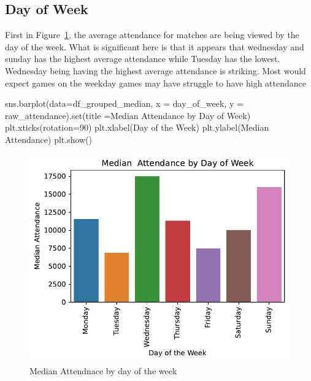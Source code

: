 \documentclass[
  letterpaper,
  DIV=11,
  numbers=noendperiod]{scrartcl}
\newenvironment{Shaded}{\begin{snugshade}}{\end{snugshade}}
\newcommand{\BuiltInTok}[1]{\textcolor[rgb]{0.00,0.23,0.31}{#1}}
\newcommand{\DecValTok}[1]{\textcolor[rgb]{0.68,0.00,0.00}{#1}}
\newcommand{\NormalTok}[1]{\textcolor[rgb]{0.00,0.23,0.31}{#1}}
\newcommand{\OperatorTok}[1]{\textcolor[rgb]{0.37,0.37,0.37}{#1}}
\newcommand{\StringTok}[1]{\textcolor[rgb]{0.13,0.47,0.30}{#1}}
\begin{document}
\hypertarget{day-of-week}{%
\subsection{Day of Week}\label{day-of-week}}

First in Figure~\ref{fig-day_median_attend}, the average attendance for
matches are being viewed by the day of the week. What is significant
here is that it appears that wednesday and sunday has the highest
average attendance while Tuesday has the lowest. Wednesday being having
the highest average attendance is striking. Most would expect games on
the weekday games may have struggle to have high attendance

\begin{Shaded}
\begin{Highlighting}[]
\NormalTok{sns.barplot(data}\OperatorTok{=}\NormalTok{df\_grouped\_median, x }\OperatorTok{=} \StringTok{\textquotesingle{}day\_of\_week\textquotesingle{}}\NormalTok{, y }\OperatorTok{=} \StringTok{\textquotesingle{}raw\_attendance\textquotesingle{}}\NormalTok{).}\BuiltInTok{set}\NormalTok{(title }\OperatorTok{=}\StringTok{\textquotesingle{}Median  Attendance by Day of Week\textquotesingle{}}\NormalTok{)}
\NormalTok{plt.xticks(rotation}\OperatorTok{=}\DecValTok{90}\NormalTok{)}
\NormalTok{plt.xlabel(}\StringTok{\textquotesingle{}Day of the Week\textquotesingle{}}\NormalTok{)}
\NormalTok{plt.ylabel(}\StringTok{\textquotesingle{}Median Attendance\textquotesingle{}}\NormalTok{)}
\NormalTok{plt.show()}
\end{Highlighting}
\end{Shaded}

\begin{figure}[H]

{\centering \includegraphics{Blog_post_files/figure-pdf/fig-day_median_attend-output-1.pdf}

}

\caption{\label{fig-day_median_attend}Median Attendnace by day of the
week}

\end{figure}
\end{document}
